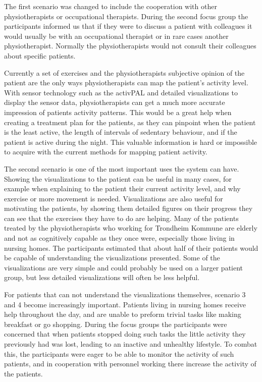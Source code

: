 The first scenario was changed to include the cooperation with other physiotherapists or occupational therapists. During the second focus group the participants informed us that if they were to discuss a patient with colleagues it would usually be with an occupational therapist or in rare cases another physiotherapist. Normally the physiotherapists would not consult their colleagues about specific patients. 

Currently a set of exercises and the physiotherapists subjective opinion of the patient are the only ways physiotherapists can map the patient's activity level. With sensor technology such as the activPAL and detailed visualizations to display the sensor data, physiotherapists can get a much more accurate impression of patients activity patterns. This would be a great help when creating a treatment plan for the patients, as they can pinpoint when the patient is the least active, the length of intervals of sedentary behaviour, and if the patient is active during the night. This valuable information is hard or impossible to acquire with the current methods for mapping patient activity.

The second scenario is one of the most important uses the system can have. Showing the visualizations to the patient can be useful in many cases, for example when explaining to the patient their current activity level, and why exercise or more movement is needed. Visualizations are also useful for motivating the patients, by showing them detailed figures on their progress they can see that the exercises they have to do are helping. Many of the patients treated by the physiotherapists who working for Trondheim Kommune are elderly and not as cognitively capable as they once were, especially those living in nursing homes. The participants estimated that about half of their patients would be capable of understanding the visualizations presented. Some of the visualizations are very simple and could probably be used on a larger patient group, but less detailed visualizations will often be less helpful. 

For patients that can not understand the visualizations themselves, scenario 3 and 4 become increasingly important. Patients living in nursing homes receive help throughout the day, and are unable to preform trivial tasks like making breakfast or go shopping. During the focus groups the participants were concerned that when patients stopped doing such tasks the little activity they previously had was lost, leading to an inactive and unhealthy lifestyle. To combat this, the participants were eager to be able to monitor the activity of such patients, and in cooperation with personnel working there increase the activity of the patients. 

